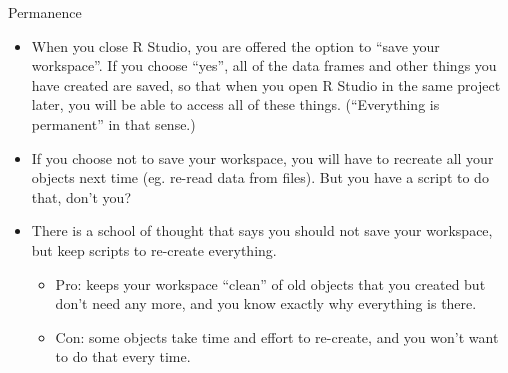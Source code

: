 \documentclass[
  ignorenonframetext,
]{beamer}
\providecommand{\tightlist}{%
  \setlength{\itemsep}{0pt}\setlength{\parskip}{0pt}}
\begin{document}
\begin{frame}{Permanence}
\protect\hypertarget{permanence}{}

\begin{itemize}
\tightlist
\item
  When you close R Studio, you are offered the option to ``save your
  workspace''. If you choose ``yes'', all of the data frames and other
  things you have created are saved, so that when you open R Studio in
  the same project later, you will be able to access all of these
  things. (``Everything is permanent'' in that sense.)
\item
  If you choose not to save your workspace, you will have to recreate
  all your objects next time (eg. re-read data from files). But you have
  a script to do that, don't you?
\item
  There is a school of thought that says you should not save your
  workspace, but keep scripts to re-create everything.

  \begin{itemize}
  \tightlist
  \item
    Pro: keeps your workspace ``clean'' of old objects that you created
    but don't need any more, and you know exactly why everything is
    there.
  \item
    Con: some objects take time and effort to re-create, and you won't
    want to do that every time.
  \end{itemize}
\end{itemize}

\end{frame}
\end{document}
